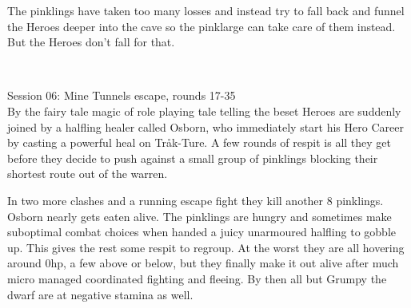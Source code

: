 The pinklings have taken too many losses and instead try to fall back and funnel the Heroes deeper into the cave so the pinklarge can take care of them instead. But the Heroes don't fall for that.

\

\forceindent Session 06: Mine Tunnels escape, rounds 17-35\\            %
By the fairy tale magic of role playing tale telling the beset Heroes are suddenly joined by a halfling healer called Osborn, who immediately start his Hero Career by casting a powerful heal on Tråk-Ture. A few rounds of respit is all they get before they decide to push against a small group of pinklings blocking their shortest route out of the warren.

In two more clashes and a running escape fight they kill another 8 pinklings. Osborn nearly gets eaten alive. The pinklings are hungry and sometimes make suboptimal combat choices when handed a juicy unarmoured halfling to gobble up. This gives the rest some respit to regroup. At the worst they are all hovering around 0hp, a few above or below, but they finally make it out alive after much micro managed coordinated fighting and fleeing. By then all but Grumpy the dwarf are at negative stamina as well.


